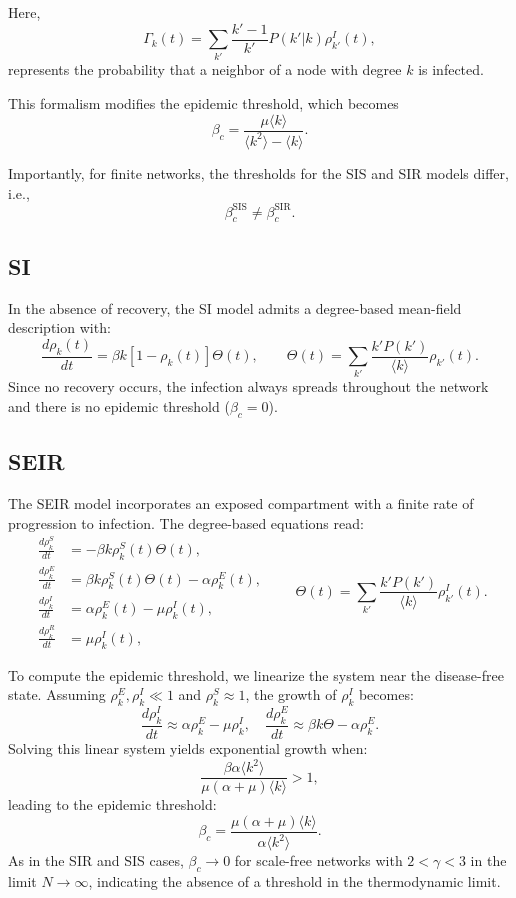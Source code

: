 Here,  
\[
\Gamma_k(t) = \sum_{k'} \frac{k' - 1}{k'} P(k'|k) \rho_{k'}^I(t),
\]  
represents the probability that a neighbor of a node with degree \(k\) is infected.  

This formalism modifies the epidemic threshold, which becomes  
\[
\beta_c = \frac{\mu \langle k \rangle}{\langle k^2 \rangle - \langle k \rangle}.
\]  

Importantly, for finite networks, the thresholds for the SIS and SIR models differ, i.e.,  
\[
\beta_c^{\text{SIS}} \neq \beta_c^{\text{SIR}}.
\]

\subsection{SI}
In the absence of recovery, the SI model admits a degree-based mean-field description with:
\[
\frac{d\rho_k(t)}{dt} = \beta k \left[1 - \rho_k(t)\right] \Theta(t),
\qquad
\Theta(t) = \sum_{k'} \frac{k' P(k')}{\langle k \rangle} \rho_{k'}(t).
\]
Since no recovery occurs, the infection always spreads throughout the network and there is no epidemic threshold (\(\beta_c = 0\)).

\subsection{SEIR} 
The SEIR model incorporates an exposed compartment with a finite rate of progression to infection. The degree-based equations read:
\[
\begin{aligned}
\frac{d\rho_k^S}{dt} &= -\beta k \rho_k^S(t) \Theta(t), \\
\frac{d\rho_k^E}{dt} &= \beta k \rho_k^S(t) \Theta(t) - \alpha \rho_k^E(t), \\
\frac{d\rho_k^I}{dt} &= \alpha \rho_k^E(t) - \mu \rho_k^I(t), \\
\frac{d\rho_k^R}{dt} &= \mu \rho_k^I(t),
\end{aligned}
\qquad
\Theta(t) = \sum_{k'} \frac{k' P(k')}{\langle k \rangle} \rho_{k'}^I(t).
\]

To compute the epidemic threshold, we linearize the system near the disease-free state. Assuming \(\rho_k^E, \rho_k^I \ll 1\) and \(\rho_k^S \approx 1\), the growth of \(\rho_k^I\) becomes:
\[
\frac{d\rho_k^I}{dt} \approx \alpha \rho_k^E - \mu \rho_k^I, \quad
\frac{d\rho_k^E}{dt} \approx \beta k \Theta - \alpha \rho_k^E.
\]
Solving this linear system yields exponential growth when:
\[
\frac{\beta \alpha \langle k^2 \rangle}{\mu (\alpha + \mu) \langle k \rangle} > 1,
\]
leading to the epidemic threshold:
\[
\beta_c = \frac{\mu (\alpha + \mu) \langle k \rangle}{\alpha \langle k^2 \rangle}.
\]
As in the SIR and SIS cases, \(\beta_c \to 0\) for scale-free networks with \(2 < \gamma < 3\) in the limit \(N \to \infty\), indicating the absence of a threshold in the thermodynamic limit.

